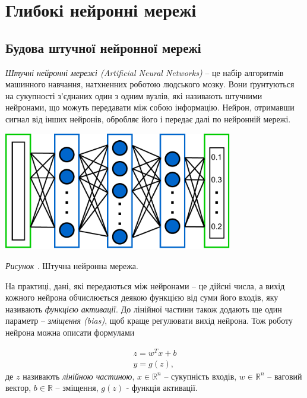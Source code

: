 \documentclass[14pt,a4paper]{extarticle}
\newcounter{e}
\newcounter{pic}
\newcommand{\pic}[1]{\refstepcounter{pic} \vspace{-0.3cm}\textit{Рисунок \arabic{pic}\label{#1}.}}
\numberwithin{equation}{section}
\numberwithin{figure}{section}
\begin{document}
 
 
 \newpage
 \thispagestyle{empty}
 \section{Глибокі нейронні мережі}
 
 
 \subsection{Будова штучної нейронної мережі}
 \textit{Штучні нейронні мережі (Artificial Neural Networks)} -- це набір алгоритмів машинного навчання, натхненних роботою людського мозку. Вони ґрунтуються на сукупності з'єднаних один з одним вузлів, які називають штучними нейронами, що можуть передавати між собою інформацію. Нейрон, отримавши сигнал від інших нейронів, обробляє його і передає далі по нейронній мережі.
 
 \begin{center}
 	\includegraphics[width=10cm]{../images/diagrams-DNN.pdf}
 \end{center}
 \begin{center}
 	\pic{dnn}
 	Штучна нейронна мережа.
 \end{center}
 
 На практиці, дані, які передаються між нейронами -- це дійсні числа, а вихід кожного нейрона обчислюється деякою функцією від суми його входів, яку називають \textit{функцією активації}. До лінійної частини також додають ще один параметр -- \textit{зміщення (bias)}, щоб краще регулювати вихід нейрона. Тож роботу нейрона можна описати формулами
 
 \begin{equation}
 \begin{array}{l}
 	z = w^Tx+b \\
 	\hat{y} = g(z),
 \end{array}
 \label{single-neuron}
 \end{equation}
 де $z$ називають \textit{лінійною частиною}, $x\in\mathbb{R}^n$ -- сукупність входів, $w \in\mathbb{R}^n$ -- ваговий вектор, $b \in\mathbb{R}$ -- зміщення, $g(z)$ - функція активації.
 
\end{document}
